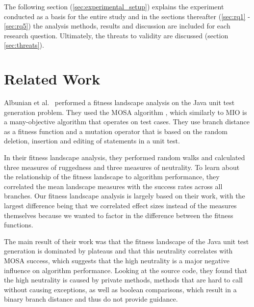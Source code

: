 \documentclass[
  a4paper,  %
  twoside,  %
  bibliography=totoc,
  headsepline,
  cleardoublepage=empty,
  parskip=half,
  draft=false
]{scrbook}
\begin{document}
The following section (\ref{sec:experimental_setup}) explains the experiment conducted as a basis for the entire study and in the sections thereafter (\ref{sec:rq1} - \ref{sec:rq5}) the analysis methods, results and discussion are included for each research question. 
Ultimately, the threats to validity are discussed (section \ref{sec:threats}).




















\chapter{Related Work}

Albunian et al.~\cite{albunian2020causes} performed a fitness landscape analysis on the Java unit test generation problem.
They used the MOSA algorithm \cite{panichella2015reformulating}, which similarly to MIO is a many-objective algorithm that operates on test cases.
They use branch distance as a fitness function and a mutation operator that is based on the random deletion, insertion and editing of statements in a unit test.

In their fitness landscape analysis, they performed random walks and calculated three measures of ruggedness and three measures of neutrality.
To learn about the relationship of the fitness landscape to algorithm performance, they correlated the mean landscape measures with the success rates across all branches.
Our fitness landscape analysis is largely based on their work, with the largest difference being that we correlated effect sizes instead of the measures themselves because we wanted to factor in the difference between the fitness functions.

The main result of their work was that the fitness landscape of the Java unit test generation is dominated by plateaus and that this neutrality correlates with MOSA success, which suggests that the high neutrality is a major negative influence on algorithm performance.
Looking at the source code, they found that the high neutrality is caused by private methods, methods that are hard to call without causing exceptions, as well as boolean comparisons, which result in a binary branch distance and thus do not provide guidance.
\end{document}
